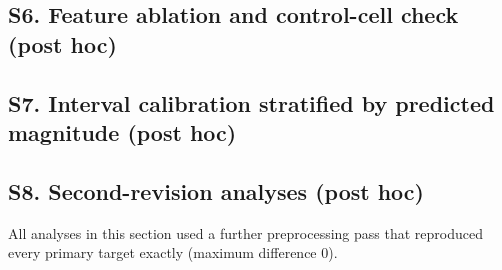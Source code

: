 \subsection*{S6. Feature ablation and control-cell check (post hoc)}
\begin{table}[H]
\centering\scriptsize
\caption{Skill on held-out single genes with different feature sets (primary folds, seed 0). The last column is the paired difference from the primary features with a 95\% bootstrap interval. ``Primary, training-half controls'' recomputes the co-expression embedding and both baseline features from the control cells that contribute only to training targets.}
\label{tab:ablation}
\resizebox{\linewidth}{!}{}
\end{table}

\subsection*{S7. Interval calibration stratified by predicted magnitude (post hoc)}
\begin{table}[H]
\centering\scriptsize
\caption{Coverage of nominal 90\% per-gene intervals on held-out single genes. ``Standard'' calibrates one quantile over all genes. ``Stratified'' calibrates it within five strata of predicted deviation from the training mean. Top-20 responders are each perturbation's 20 genes with the largest observed deviation. The width ratio compares the mean interval width on those genes (stratified / standard).}
\label{tab:intervals}

\end{table}

\subsection*{S8. Second-revision analyses (post hoc)}
All analyses in this section used a further preprocessing pass that reproduced every primary target exactly (maximum difference 0).

\begin{table}[H]
\centering\scriptsize
\caption{Technical reproducibility limits. Limits for the primary batch partition with 95\% bootstrap intervals over perturbations; range over five partitions of batches into two sets; limits from random cell halves; and the fraction of perturbations whose specific response reproduces ($r\ge0.5$) in the primary partition. Tian CRISPRa has two batches, so all its partitions are the same contrast.}
\label{tab:limits}
\resizebox{\linewidth}{!}{}
\end{table}

